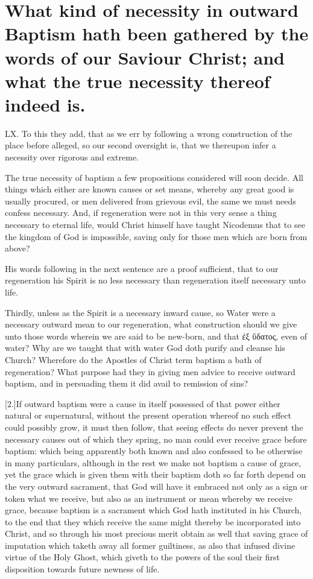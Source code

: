 \section*{What kind of necessity in outward Baptism hath been gathered by the words of our Saviour Christ; and what the true necessity thereof indeed is.}
LX. To this they add, that as we err by following a wrong construction of the place before alleged, so our second oversight is, that we thereupon infer a necessity over rigorous and extreme.

The true necessity of baptism a few propositions considered will soon decide. All things which either are known causes or set means, whereby any great good is usually procured, or men delivered from grievous evil, the same we must needs confess necessary. And, if regeneration were not in this very  sense a thing necessary to eternal life, would Christ himself have taught Nicodemus that to see the kingdom of God is impossible, saving only for those men which are born from above?

His words following in the next sentence are a proof sufficient, that to our regeneration his Spirit is no less necessary than regeneration itself necessary unto life.

Thirdly, unless as the Spirit is a necessary inward cause, so Water were a necessary outward mean to our regeneration, what construction should we give unto those words wherein we are said to be new-born, and that ἐξ ὕδατος, even of water? Why are we taught that with water God doth purify and cleanse his Church? Wherefore do the Apostles of Christ term baptism a bath of regeneration? What purpose had they in giving men advice to receive outward baptism, and in persuading them it did avail to remission of sins?

[2.]If outward baptism were a cause in itself possessed of that power either natural or supernatural, without the present operation whereof no such effect could possibly grow, it must then follow, that seeing effects do never prevent the necessary causes out of which they spring, no man could ever receive grace before baptism: which being apparently both known and also confessed to be otherwise in many particulars, although in the rest we make not baptism a cause of grace, yet the grace which is given them with their baptism doth so far forth depend on the very outward sacrament, that God will have it embraced not only as a sign or token what we receive, but also as an instrument or mean whereby we receive grace, because baptism is a sacrament which God hath instituted in his Church, to the end that they which receive the same might thereby be incorporated into Christ, and so through his most precious merit obtain as well that saving grace of imputation which taketh away all former guiltiness,  as also that infused divine virtue of the Holy Ghost, which giveth to the powers of the soul their first disposition towards future newness of life.

